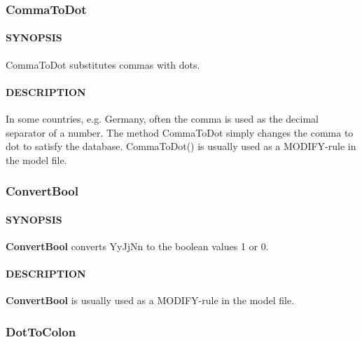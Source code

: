 \subsubsection{CommaToDot\label{CommaToDot}}




\paragraph*{SYNOPSIS\label{CommaToDot_SYNOPSIS}}


CommaToDot substitutes commas with dots.

\paragraph*{DESCRIPTION\label{CommaToDot_DESCRIPTION}}


In some countries, e.g. Germany, often the comma is used as the decimal
separator of a number. The method CommaToDot simply changes the comma to
dot to satisfy the database.
CommaToDot() is usually used as a MODIFY-rule in the model file.

\subsubsection{ConvertBool\label{ConvertBool}}




\paragraph*{SYNOPSIS\label{ConvertBool_SYNOPSIS}}


\textbf{ConvertBool} converts YyJjNn to the boolean values 1 or 0.

\paragraph*{DESCRIPTION\label{ConvertBool_DESCRIPTION}}


\textbf{ConvertBool} is usually used as a MODIFY-rule in the model file.

\subsubsection{DotToColon\label{DotToColon}}




